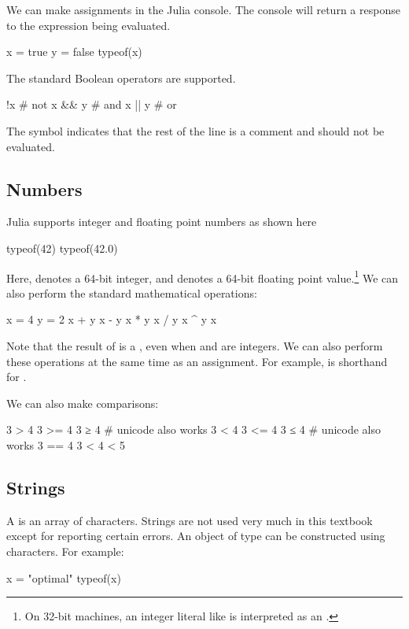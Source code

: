 We can make assignments in the Julia console. The console will return a response to the expression being evaluated.
\begin{juliaconsole}
x = true
y = false
typeof(x)
\end{juliaconsole}

The standard Boolean operators are supported.
\begin{juliaconsole}
!x     # not
x && y # and
x || y # or
\end{juliaconsole}
The \jlv{#} symbol indicates that the rest of the line is a comment and should not be evaluated.

\subsection{Numbers}

Julia supports integer and floating point numbers as shown here
\begin{juliaconsole}
typeof(42)
typeof(42.0)
\end{juliaconsole}
Here,  denotes a 64-bit integer, and  denotes a 64-bit floating point value.\footnote{On 32-bit machines, an integer literal like  is interpreted as an .} We can also perform the standard mathematical operations:
\begin{juliaconsole}
x = 4
y = 2
x + y
x - y
x * y
x / y
x ^ y
x %
\end{juliaconsole}

Note that the result of  is a , even when  and  are integers.
We can also perform these operations at the same time as an assignment. For example,  is shorthand for .

We can also make comparisons:
\begin{juliaconsole}
3 > 4
3 >= 4
3 ≥ 4   # unicode also works
3 < 4
3 <= 4
3 ≤ 4   # unicode also works
3 == 4
3 < 4 < 5
\end{juliaconsole}

\subsection{Strings}

A  is an array of characters. Strings are not used very much in this textbook except for reporting certain errors. An object of type  can be constructed using  characters. For example:
\begin{juliaconsole}
x = "optimal"
typeof(x)
\end{juliaconsole}

